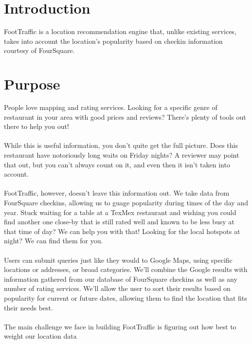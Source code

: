 \documentclass{article}
\begin{document}
%


%

%
\section{Introduction}
FootTraffic is a location recommendation engine that, unlike existing services, takes into account the
location's popularity based on checkin information courtesy of FourSquare.

\section{Purpose}
People love mapping and rating services. Looking for a specific genre of restaurant in your area with
good prices and reviews? There's plenty of tools out there to help you out!
\\ \\
While this is useful information, you don't quite get the full picture. Does this restaurant have notoriously
long waits on Friday nights? A reviewer may point that out, but you can't always count on it, and even
then it isn't taken into account.
\\ \\
FootTraffic, however, doesn't leave this information out. We take data from FourSquare checkins, allowing
us to guage popularity during times of the day and year. Stuck waiting for a table at a TexMex restaurant
and wishing you could find another one close-by that is still rated well and known to be less busy at
that time of day? We can help you with that! Looking for the local hotspots at night? We can find them for you.  
\\ \\
Users can submit queries just like they would to Google Maps, using specific locations or addresses,
or broad categories. We'll combine the Google results with information gathered from our database of
FourSquare checkins as well as any number of rating services. We'll allow the user to sort their results
based on popularity for current or future dates, allowing them to find the location that fits their needs best.
\\ \\
The main challenge we face in building FootTraffic is figuring out how best to weight our location data
\end{document}

